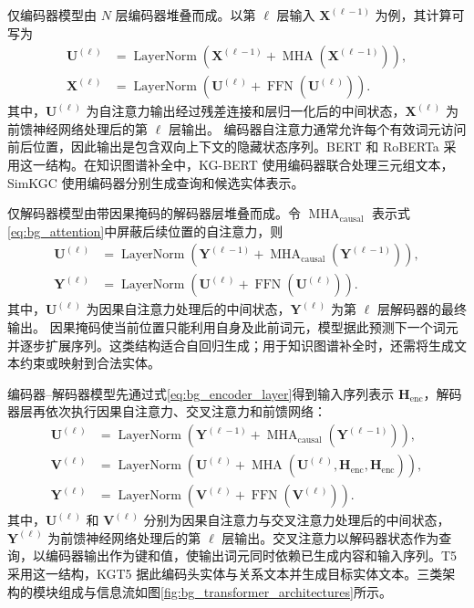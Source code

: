 仅编码器模型由 $N$ 层编码器堆叠而成。以第 $\ell$ 层输入 $\mathbf{X}^{(\ell-1)}$ 为例，其计算可写为
\begin{align}
    \mathbf{U}^{(\ell)}
      &=\operatorname{LayerNorm}\!\left(
        \mathbf{X}^{(\ell-1)}+
        \operatorname{MHA}(\mathbf{X}^{(\ell-1)})\right),\\
    \mathbf{X}^{(\ell)}
      &=\operatorname{LayerNorm}\!\left(
        \mathbf{U}^{(\ell)}+\operatorname{FFN}(\mathbf{U}^{(\ell)})\right).
    \label{eq:bg_encoder_layer}
\end{align}
其中，$\mathbf{U}^{(\ell)}$ 为自注意力输出经过残差连接和层归一化后的中间状态，$\mathbf{X}^{(\ell)}$ 为前馈神经网络处理后的第 $\ell$ 层输出。
编码器自注意力通常允许每个有效词元访问前后位置，因此输出是包含双向上下文的隐藏状态序列。BERT 和 RoBERTa 采用这一结构。在知识图谱补全中，KG-BERT 使用编码器联合处理三元组文本，SimKGC 使用编码器分别生成查询和候选实体表示。

仅解码器模型由带因果掩码的解码器层堆叠而成。令 $\operatorname{MHA}_{\mathrm{causal}}$ 表示式\eqref{eq:bg_attention}中屏蔽后续位置的自注意力，则
\begin{align}
    \mathbf{U}^{(\ell)}
      &=\operatorname{LayerNorm}\!\left(
        \mathbf{Y}^{(\ell-1)}+
        \operatorname{MHA}_{\mathrm{causal}}(\mathbf{Y}^{(\ell-1)})\right),\\
    \mathbf{Y}^{(\ell)}
      &=\operatorname{LayerNorm}\!\left(
        \mathbf{U}^{(\ell)}+\operatorname{FFN}(\mathbf{U}^{(\ell)})\right).
    \label{eq:bg_decoder_only_layer}
\end{align}
其中，$\mathbf{U}^{(\ell)}$ 为因果自注意力处理后的中间状态，$\mathbf{Y}^{(\ell)}$ 为第 $\ell$ 层解码器的最终输出。
因果掩码使当前位置只能利用自身及此前词元，模型据此预测下一个词元并逐步扩展序列。这类结构适合自回归生成；用于知识图谱补全时，还需将生成文本约束或映射到合法实体。

编码器--解码器模型先通过式\eqref{eq:bg_encoder_layer}得到输入序列表示 $\mathbf{H}_{\mathrm{enc}}$，解码器层再依次执行因果自注意力、交叉注意力和前馈网络：
\begin{align}
    \mathbf{U}^{(\ell)}
      &=\operatorname{LayerNorm}\!\left(
        \mathbf{Y}^{(\ell-1)}+
        \operatorname{MHA}_{\mathrm{causal}}(\mathbf{Y}^{(\ell-1)})\right),\\
    \mathbf{V}^{(\ell)}
      &=\operatorname{LayerNorm}\!\left(
        \mathbf{U}^{(\ell)}+
        \operatorname{MHA}(\mathbf{U}^{(\ell)},
        \mathbf{H}_{\mathrm{enc}},\mathbf{H}_{\mathrm{enc}})\right),\\
    \mathbf{Y}^{(\ell)}
      &=\operatorname{LayerNorm}\!\left(
        \mathbf{V}^{(\ell)}+\operatorname{FFN}(\mathbf{V}^{(\ell)})\right).
    \label{eq:bg_encoder_decoder_layer}
\end{align}
其中，$\mathbf{U}^{(\ell)}$ 和 $\mathbf{V}^{(\ell)}$ 分别为因果自注意力与交叉注意力处理后的中间状态，$\mathbf{Y}^{(\ell)}$ 为前馈神经网络处理后的第 $\ell$ 层输出。交叉注意力以解码器状态作为查询，以编码器输出作为键和值，使输出词元同时依赖已生成内容和输入序列。T5 采用这一结构，KGT5 据此编码头实体与关系文本并生成目标实体文本。三类架构的模块组成与信息流如图\ref{fig:bg_transformer_architectures}所示。

